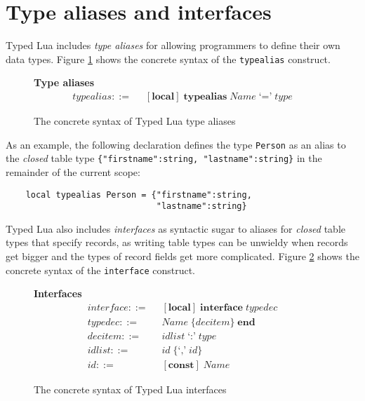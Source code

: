 \section{Type aliases and interfaces}
\label{sec:alias}

Typed Lua includes \emph{type aliases} for allowing programmers to
define their own data types.
Figure \ref{fig:aliases} shows the concrete syntax of the
\texttt{typealias} construct.

\begin{figure}[!ht]
\textbf{Type aliases}\\
\dstart
\begin{align*}
\textit{typealias} ::= & \;\; [\textbf{local}] \; \textbf{typealias} \; \textit{Name} \; \texttt{`='} \; \textit{type}
\end{align*}
\dend
\caption{The concrete syntax of Typed Lua type aliases}
\label{fig:aliases}
\end{figure}

As an example, the following declaration defines the type \texttt{Person}
as an alias to the \emph{closed} table type \texttt{\{"firstname":string, "lastname":string\}}
in the remainder of the current scope:
\begin{verbatim}
    local typealias Person = {"firstname":string,
                              "lastname":string}
\end{verbatim}

Typed Lua also includes \emph{interfaces} as syntactic sugar to aliases
for \emph{closed} table types that specify records, as writing table types can be unwieldy
when records get bigger and the types of record fields get more complicated.
Figure \ref{fig:interfaces} shows the concrete syntax of the
\texttt{interface} construct.

\begin{figure}[!ht]
\textbf{Interfaces}\\
\dstart
\begin{align*}
\textit{interface} ::= & \;\; [\textbf{local}] \; \textbf{interface} \; \textit{typedec}\\
\textit{typedec} ::= & \;\; \textit{Name} \; \{\textit{decitem}\} \; \textbf{end}\\
\textit{decitem} ::= & \;\; \textit{idlist} \; \texttt{`:'} \; \textit{type}\\
\textit{idlist} ::= & \;\; \textit{id} \; \{\texttt{`,'} \; \textit{id}\}\\
\textit{id} ::= & \;\; [\textbf{const}] \; \textit{Name}
\end{align*}
\dend
\caption{The concrete syntax of Typed Lua interfaces}
\label{fig:interfaces}
\end{figure}

